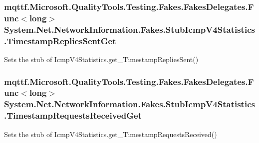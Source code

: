\hypertarget{class_system_1_1_net_1_1_network_information_1_1_fakes_1_1_stub_icmp_v4_statistics_ab72b48e0584425357fe9412006648b64}{
\subsubsection[{Timestamp\-Replies\-Sent\-Get}]{\setlength{\rightskip}{0pt plus 5cm}mqttf.\-Microsoft.\-Quality\-Tools.\-Testing.\-Fakes.\-Fakes\-Delegates.\-Func$<$long$>$ System.\-Net.\-Network\-Information.\-Fakes.\-Stub\-Icmp\-V4\-Statistics.\-Timestamp\-Replies\-Sent\-Get}}\label{class_system_1_1_net_1_1_network_information_1_1_fakes_1_1_stub_icmp_v4_statistics_ab72b48e0584425357fe9412006648b64}


Sets the stub of Icmp\-V4\-Statistics.\-get\-\_\-\-Timestamp\-Replies\-Sent()

\hypertarget{class_system_1_1_net_1_1_network_information_1_1_fakes_1_1_stub_icmp_v4_statistics_a078a420dc01d0f5a87bca8c3f518d362}{
\subsubsection[{Timestamp\-Requests\-Received\-Get}]{\setlength{\rightskip}{0pt plus 5cm}mqttf.\-Microsoft.\-Quality\-Tools.\-Testing.\-Fakes.\-Fakes\-Delegates.\-Func$<$long$>$ System.\-Net.\-Network\-Information.\-Fakes.\-Stub\-Icmp\-V4\-Statistics.\-Timestamp\-Requests\-Received\-Get}}\label{class_system_1_1_net_1_1_network_information_1_1_fakes_1_1_stub_icmp_v4_statistics_a078a420dc01d0f5a87bca8c3f518d362}


Sets the stub of Icmp\-V4\-Statistics.\-get\-\_\-\-Timestamp\-Requests\-Received()

